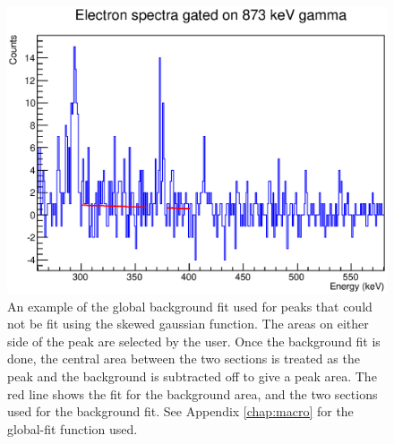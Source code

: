 \begin{figure}
    \centering
    \includegraphics[scale=0.6]{Analysis_Figs/Piecewise_example.eps}
    \caption{An example of the global background fit used for peaks that could not be fit using the skewed gaussian function. The areas on either side of the peak are selected by the user. Once the background fit is done, the central area between the two sections is treated as the peak and the background is subtracted off to give a peak area. The red line shows the fit for the background area, and the two sections used for the background fit. See Appendix \ref{chap:macro} for the global-fit function used.}
    \label{fig:piecewise}
\end{figure}